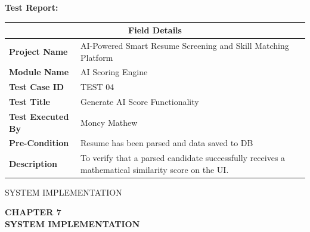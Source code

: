 \documentclass[12pt,a4paper]{report}
\begin{document}
\textbf{Test Report:}
\begin{table}[H]
\centering
\renewcommand{\arraystretch}{1.5}
\begin{tabular}{|p{4.5cm}|p{9.5cm}|}
\hline
\multicolumn{2}{|c|}{\textbf{Field Details}} \\ \hline
\textbf{Project Name} & AI-Powered Smart Resume Screening and Skill Matching Platform \\ \hline
\textbf{Module Name} & AI Scoring Engine \\ \hline
\textbf{Test Case ID} & TEST 04 \\ \hline
\textbf{Test Title} & Generate AI Score Functionality \\ \hline
\textbf{Test Executed By} & Moncy Mathew \\ \hline
\textbf{Pre-Condition} & Resume has been parsed and data saved to DB \\ \hline
\textbf{Description} & To verify that a parsed candidate successfully receives a mathematical similarity score on the UI. \\ \hline
\end{tabular}
\end{table}
\clearpage


{\protect\numberline{\thechapter}SYSTEM IMPLEMENTATION}

\thispagestyle{empty}

\vspace*{\fill}

\begin{center}
    {\fontsize{14pt}{17pt}\selectfont\textbf{CHAPTER 7}}\\[1cm]
    {\fontsize{14pt}{17pt}\selectfont\textbf{SYSTEM IMPLEMENTATION}}
\end{center}

\vspace*{\fill}

\clearpage
\end{document}
